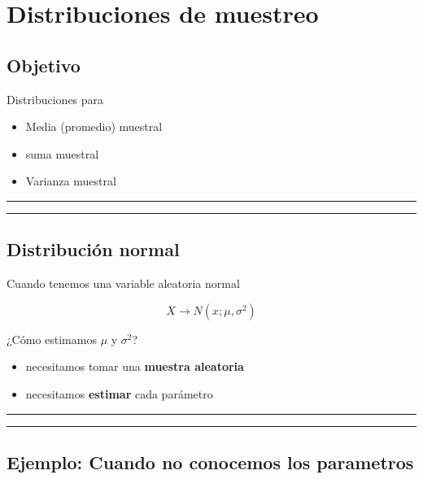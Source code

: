 \documentclass[
]{book}
\providecommand{\tightlist}{%
  \setlength{\itemsep}{0pt}\setlength{\parskip}{0pt}}
\begin{document}
\hypertarget{distribuciones-de-muestreo}{%
\chapter{Distribuciones de muestreo}\label{distribuciones-de-muestreo}}

\hypertarget{objetivo-9}{%
\section{Objetivo}\label{objetivo-9}}

Distribuciones para

\begin{itemize}
\tightlist
\item
  Media (promedio) muestral
\item
  suma muestral
\item
  Varianza muestral
\end{itemize}

\begin{center}\rule{0.5\linewidth}{0.5pt}\end{center}

\begin{center}\rule{0.5\linewidth}{0.5pt}\end{center}

\hypertarget{distribuciuxf3n-normal-8}{%
\section{Distribución normal}\label{distribuciuxf3n-normal-8}}

Cuando tenemos una variable aleatoria normal

\[X \rightarrow N(x; \mu, \sigma^2)\]

¿Cómo estimamos \(\mu\) y \(\sigma^2\)?

\begin{itemize}
\item
  necesitamos tomar una \textbf{muestra aleatoria}
\item
  necesitamos \textbf{estimar} cada parámetro
\end{itemize}

\begin{center}\rule{0.5\linewidth}{0.5pt}\end{center}

\begin{center}\rule{0.5\linewidth}{0.5pt}\end{center}

\hypertarget{ejemplo-cuando-no-conocemos-los-parametros}{%
\section{Ejemplo: Cuando no conocemos los parametros}\label{ejemplo-cuando-no-conocemos-los-parametros}}
\end{document}
